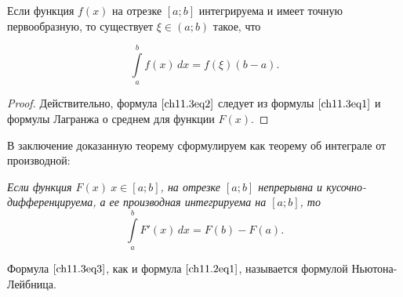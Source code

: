 \begin{cons}
Если функция $f(x)$ на отрезке $[a;b]$ интегрируема и имеет точную первообразную, то существует $\xi \in (a;b)$ такое, что

\begin{equation} \label{ch11.3eq2}
\int\limits_{a}^{b}f(x) \,dx = f(\xi) (b - a).
\end{equation}

\end{cons}
\begin{proof}
Действительно, формула $\eqref{ch11.3eq2}$ следует из формулы $\eqref{ch11.3eq1}$ и формулы Лагранжа о среднем для функции $F(x)$.
\end{proof}

В заключение доказанную теорему сформулируем как теорему об интеграле от производной:

\textit{Если функция $F(x) \: x \in [a;b]$, на отрезке $[a;b]$ непрерывна и кусочно-дифференцируема, а ее производная интегрируема на $[a;b]$, то}
\begin{equation} \label{ch11.3eq3}
\int\limits_{a}^{b}F'(x) \,dx = F(b) - F(a).
\end{equation} 

Формула $\eqref{ch11.3eq3}$, как и формула $\eqref{ch11.2eq1}$, называется формулой Ньютона-Лейбница.